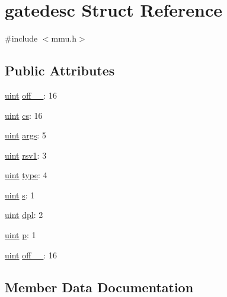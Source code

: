 \hypertarget{structgatedesc}{}\section{gatedesc Struct Reference}
\label{structgatedesc}


{\ttfamily \#include $<$mmu.\+h$>$}

\subsection*{Public Attributes}
\begin{DoxyCompactItemize}
\item 
\hyperlink{custom__types_8h_a91ad9478d81a7aaf2593e8d9c3d06a14}{uint} \hyperlink{structgatedesc_a4f7268ba32b6a8b3963aa6d23e51af59}{off\+\_\+\_}\+: 16
\item 
\hyperlink{custom__types_8h_a91ad9478d81a7aaf2593e8d9c3d06a14}{uint} \hyperlink{structgatedesc_a53e768c461dce9cc97048e7d19351af1}{cs}\+: 16
\item 
\hyperlink{custom__types_8h_a91ad9478d81a7aaf2593e8d9c3d06a14}{uint} \hyperlink{structgatedesc_a9b41bea284fe0922c440f4c253e926ff}{args}\+: 5
\item 
\hyperlink{custom__types_8h_a91ad9478d81a7aaf2593e8d9c3d06a14}{uint} \hyperlink{structgatedesc_ad11779f5ce40e53a8feb3dfdaf3f0ee5}{rsv1}\+: 3
\item 
\hyperlink{custom__types_8h_a91ad9478d81a7aaf2593e8d9c3d06a14}{uint} \hyperlink{structgatedesc_a41d6e5fb9bb27699bdb7d729c67ff32c}{type}\+: 4
\item 
\hyperlink{custom__types_8h_a91ad9478d81a7aaf2593e8d9c3d06a14}{uint} \hyperlink{structgatedesc_a54d731df342be3a775cc847a3dab1a53}{s}\+: 1
\item 
\hyperlink{custom__types_8h_a91ad9478d81a7aaf2593e8d9c3d06a14}{uint} \hyperlink{structgatedesc_a4c62f5618440769c78ed976cae23c13d}{dpl}\+: 2
\item 
\hyperlink{custom__types_8h_a91ad9478d81a7aaf2593e8d9c3d06a14}{uint} \hyperlink{structgatedesc_a5f754b650dc96be286cbc74e69da6a81}{p}\+: 1
\item 
\hyperlink{custom__types_8h_a91ad9478d81a7aaf2593e8d9c3d06a14}{uint} \hyperlink{structgatedesc_af388a77c8f2a8a8c0bd1ca74a7dbaef7}{off\+\_\+\_}\+: 16
\end{DoxyCompactItemize}


\subsection{Member Data Documentation}
